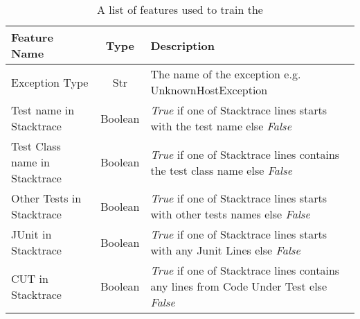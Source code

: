 \begin{table*}[t]
    \caption{A list of features used to train the \classifier}
\label{table:Features}
\vspace{-5pt}
\newcommand{\failureRateWidth}{2.5in}
\newcommand{\failureRateHeight}{4em}
\scriptsize
\centering
    \begin{tabular}{l|c|l}
    \toprule     
     \textbf{Feature Name}&\textbf{Type}&\textbf{Description}\\
        \midrule
        Exception Type & Str & The name of the exception e.g. UnknownHostException \\
        Test name in Stacktrace & Boolean & \textit{True} if one of Stacktrace lines starts with the test name else \textit{False} \\
        Test Class name in Stacktrace & Boolean & \textit{True} if one of Stacktrace lines contains the test class name else \textit{False} \\
        Other Tests in Stacktrace & Boolean & \textit{True} if one of Stacktrace lines starts with other tests names else \textit{False} \\
        JUnit in Stacktrace & Boolean & \textit{True} if one of Stacktrace lines starts with any Junit Lines else \textit{False} \\
        CUT in Stacktrace & Boolean & \textit{True} if one of Stacktrace lines contains any lines from Code Under Test else \textit{False} \\
\bottomrule 
\end{tabular}
\vspace{-10pt}
\end{table*}





